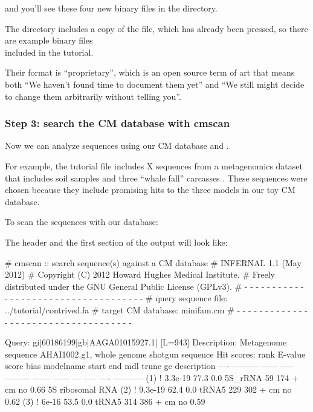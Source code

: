 and you'll see these four new binary files in the directory. 

The  directory includes a copy of the
 file, which has already been pressed, so there
are example binary files\\
included in the tutorial.

Their format is ``proprietary'', which is an open source term of art
that means both ``We haven't found time to document them yet'' and ``We
still might decide to change them arbitrarily without telling you''.

\subsubsection{Step 3: search the CM database with cmscan}

Now we can analyze sequences using our CM database and
. 

For example, the tutorial file  includes X
sequences from a metagenomics dataset that includes soil samples and three
``whale fall'' carcasses \cite{Tringe05}. These sequences were
chosen because they include promising hits to the three models in
our toy CM database.

To scan the sequences with our database: 


The header and the first section of the output will look like:

\begin{sreoutput}
# cmscan :: search sequence(s) against a CM database
# INFERNAL 1.1 (May 2012)
# Copyright (C) 2012 Howard Hughes Medical Institute.
# Freely distributed under the GNU General Public License (GPLv3).
# - - - - - - - - - - - - - - - - - - - - - - - - - - - - - - - - - - - -
# query sequence file:                   ../tutorial/contrived.fa
# target CM database:                    minifam.cm
# - - - - - - - - - - - - - - - - - - - - - - - - - - - - - - - - - - - -

Query:       gi|60186199|gb|AAGA01015927.1|  [L=943]
Description: Metagenome sequence AHAI1002.g1, whole genome shotgun sequence
Hit scores:
 rank     E-value  score  bias  modelname  start    end   mdl trunc   gc  description
 ----   --------- ------ -----  --------- ------ ------   --- ----- ----  -----------
  (1) !   3.3e-19   77.3   0.0  5S_rRNA       59    174 +  cm    no 0.66  5S ribosomal RNA
  (2) !   9.3e-19   62.4   0.0  tRNA5        229    302 +  cm    no 0.62  
  (3) !     6e-16   53.5   0.0  tRNA5        314    386 +  cm    no 0.59  
\end{sreoutput}

